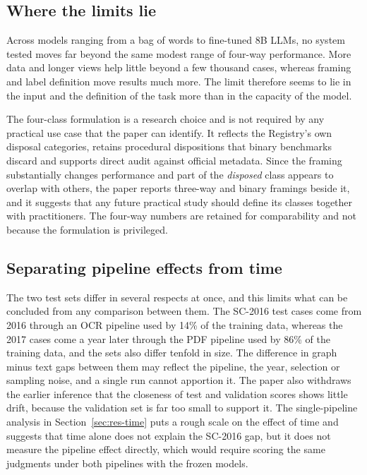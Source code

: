 \documentclass[journal]{IEEEtran}
\newcommand{\cls}[1]{\emph{#1}}
\begin{document}
\subsection{Where the limits lie}
Across models ranging from a bag of words to fine-tuned 8B LLMs, no system tested moves far beyond the same modest range of four-way performance. More data and longer views help little beyond a few thousand cases, whereas framing and label definition move results much more. The limit therefore seems to lie in the input and the definition of the task more than in the capacity of the model.

The four-class formulation is a research choice and is not required by any practical use case that the paper can identify. It reflects the Registry's own disposal categories, retains procedural dispositions that binary benchmarks discard and supports direct audit against official metadata. Since the framing substantially changes performance and part of the \cls{disposed} class appears to overlap with others, the paper reports three-way and binary framings beside it, and it suggests that any future practical study should define its classes together with practitioners. The four-way numbers are retained for comparability and not because the formulation is privileged.

\subsection{Separating pipeline effects from time}
The two test sets differ in several respects at once, and this limits what can be concluded from any comparison between them. The SC-2016 test cases come from 2016 through an OCR pipeline used by 14\% of the training data, whereas the 2017 cases come a year later through the PDF pipeline used by 86\% of the training data, and the sets also differ tenfold in size. The difference in graph minus text gaps between them may reflect the pipeline, the year, selection or sampling noise, and a single run cannot apportion it. The paper also withdraws the earlier inference that the closeness of test and validation scores shows little drift, because the validation set is far too small to support it. The single-pipeline analysis in Section~\ref{sec:res-time} puts a rough scale on the effect of time and suggests that time alone does not explain the SC-2016 gap, but it does not measure the pipeline effect directly, which would require scoring the same judgments under both pipelines with the frozen models.
\end{document}
